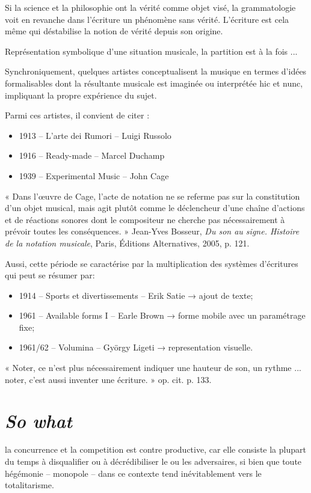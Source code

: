\documentclass{article}
\begin{document}
 Si la science et la philosophie ont la vérité comme objet visé, la grammatologie
voit en revanche dans l’écriture un phénomène sans vérité. L’écriture est cela même qui
déstabilise la notion de vérité depuis son origine.

Représentation symbolique d'une situation musicale, la partition est à la fois ...

%    
 Synchroniquement, quelques artistes conceptualisent la musique en termes d’idées formalisables dont la résultante musicale est imaginée ou interprétée hic et nunc, impliquant la propre expérience du sujet.

Parmi ces artistes, il convient de citer :
\begin{itemize}
\item 1913 – L’arte dei Rumori – Luigi Russolo
\item 1916 – Ready-made – Marcel Duchamp
\item 1939 – Experimental Music – John Cage
\end{itemize}

« Dans l'œuvre de Cage, l'acte de notation ne se referme pas sur la constitution d'un objet musical, mais agit plutôt comme le déclencheur d'une chaîne d'actions et de réactions sonores dont le compositeur ne cherche pas nécessairement à prévoir toutes les conséquences. » Jean-Yves Bosseur, \textit{Du son au signe. Histoire de la notation musicale}, Paris, Éditions Alternatives, 2005, p. 121.

Aussi, cette période se caractérise par la multiplication des systèmes d'écritures qui peut se résumer par:
\begin{itemize}
\item 1914 – Sports et divertissements – Erik Satie → ajout de texte;
\item 1961 – Available forms I – Earle Brown → forme mobile avec un paramétrage fixe;
\item 1961/62 – Volumina – György Ligeti → representation visuelle.
\end{itemize}

« Noter, ce n'est plus nécessairement indiquer une hauteur de son, un rythme ... noter, c'est aussi inventer une écriture. » op. cit. p. 133.
 
\section{\textsl{So what}}


la concurrence et la competition est contre productive, car elle consiste la plupart du temps à disqualifier ou à décrédibiliser le ou les adversaires, si bien que toute hégémonie -- monopole -- dans ce contexte tend inévitablement vers le totalitarisme.
\end{document}
